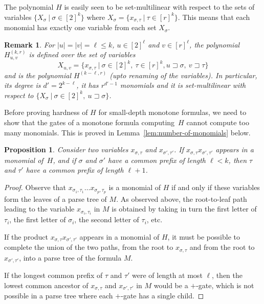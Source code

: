 \documentclass[10pt,a4paper]{article}
\newtheorem{proposition}[theorem]{Proposition}
\newtheorem{remark}[theorem]{Remark}
\newcommand{\prefix}{\sqsupset}
\newcommand{\comment}[2]{\marginpar{\tiny{\textbf{#1: }\textit{#2}}}}
\newcommand{\hf}[1]{\comment{HF}{#1}}
\newcommand{\st}[1]{\comment{ST}{#1}}
\begin{document}
The polynomial $H$ is easily seen to be set-multilinear with respect to
the sets of variables $\{ X_\sigma\ |\ \sigma \in [2]^k\}$
where $X_\sigma = \{x_{\sigma,\tau}\ |\ \tau \in [r]^{k} \}$. This means that each monomial has exactly one variable from each set $X_\sigma$.

\begin{remark}
	\label{rem:isomorphic-subpolynomials}
	For $|u|=|v|=\ell \leq k$, $u \in [2]^\ell$ and $v \in [r]^\ell$,
	the polynomial $H^{(k,r)}_{u,v}$
	is defined over the set of variables
	$$X_{u,v} = \{ x_{\sigma,\tau}\ |\ \sigma \in [2]^k,\ \tau \in [r]^{k}, u \prefix \sigma,\ v\prefix \tau\}$$
	and is the polynomial $H^{(k-\ell,r)}$ (upto renaming of the variables).
	In particular, its degree is $d'=2^{k-\ell}$,
	it has $r^{d'-1}$ monomials 
	and it is set-multilinear with
	respect to $\{ X_\sigma\ |\ \sigma \in [2]^k,\ u\prefix \sigma\}$.
\end{remark}

Before proving hardness of $H$ for small-depth monotone formulas, we need to show that the gates of a monotone formula computing~\(H\) cannot compute too many monomials. This is proved in Lemma~\ref{lem:number-of-monomials} below.

\begin{proposition}
	\label{prop:product-of-variables-in-H}
	Consider two variables $x_{\sigma,\tau}$ and $x_{\sigma',\tau'}$.
	If $x_{\sigma,\tau} x_{\sigma',\tau'}$ appears in a monomial of~$H$,
	and if $\sigma$ and $\sigma'$ have a common prefix of length $\ell < k$,
	then $\tau$ and $\tau'$ have a common prefix of length $\ell+1$.
\end{proposition}

\begin{proof}
	Observe that
	$x_{\sigma_1,\tau_1} \ldots x_{\sigma_p,\tau_p}$ is a monomial of $H$ if and only if
	these variables
	form the leaves of a parse tree of $M$.
	As observed above, the root-to-leaf path leading to the variable
	$x_{\sigma_i,\tau_i}$ in $M$
	is obtained by taking in turn the first letter of  $\tau_i$, the first letter of $\sigma_i$, the second letter of $\tau_i$, etc.
	
	If the product $x_{\sigma,\tau} x_{\sigma',\tau'}$ appears in a monomial of $H$, it must
	be possible to complete
	the union of the two paths, from the root to $x_{\sigma,\tau}$ and from the root to $x_{\sigma',\tau'}$,
	into a parse tree of the formula $M$.
	
	If the longest common prefix of $\tau$ and $\tau'$ were of length at most $\ell$,
	then the lowest common ancestor of $x_{\sigma,\tau}$ and $x_{\sigma',\tau'}$ in $M$ would be a $+$-gate,
	which is not possible in a parse tree where each $+$-gate has a single child.
\end{proof}
\end{document}
